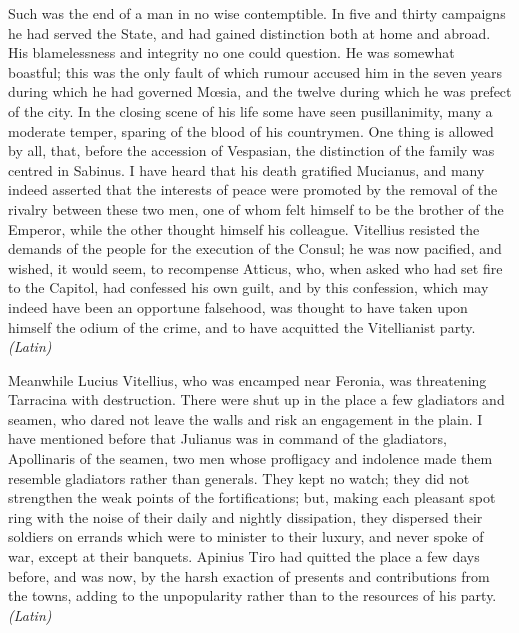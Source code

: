 
Such was the end of a man in no wise contemptible. In five and thirty campaigns he had served the State, and had gained distinction both at home and abroad. His blamelessness and integrity no one could question. He was somewhat boastful; this was the only fault of which rumour accused him in the seven years during which he had governed Mœsia, and the twelve during which he was prefect of the city. In the closing scene of his life some have seen pusillanimity, many a moderate temper, sparing of the blood of his countrymen. One thing is allowed by all, that, before the accession of Vespasian, the distinction of the family was centred in Sabinus. I have heard that his death gratified Mucianus, and many indeed asserted that the interests of peace were promoted by the removal of the rivalry between these two men, one of whom felt himself to be the brother of the Emperor, while the other thought himself his colleague. Vitellius resisted the demands of the people for the execution of the Consul; he was now pacified, and wished, it would seem, to recompense Atticus, who, when asked who had set fire to the Capitol, had confessed his own guilt, and by this confession, which may indeed have been an opportune falsehood, was thought to have taken upon himself the odium of the crime, and to have acquitted the Vitellianist party. \emph{(Latin)}


Meanwhile Lucius Vitellius, who was encamped near Feronia, was threatening Tarracina with destruction. There were shut up in the place a few gladiators and seamen, who dared not leave the walls and risk an engagement in the plain. I have mentioned before that Julianus was in command of the gladiators, Apollinaris of the seamen, two men whose profligacy and indolence made them resemble gladiators rather than generals. They kept no watch; they did not strengthen the weak points of the fortifications; but, making each pleasant spot ring with the noise of their daily and nightly dissipation, they dispersed their soldiers on errands which were to minister to their luxury, and never spoke of war, except at their banquets. Apinius Tiro had quitted the place a few days before, and was now, by the harsh exaction of presents and contributions from the towns, adding to the unpopularity rather than to the resources of his party. \emph{(Latin)}


